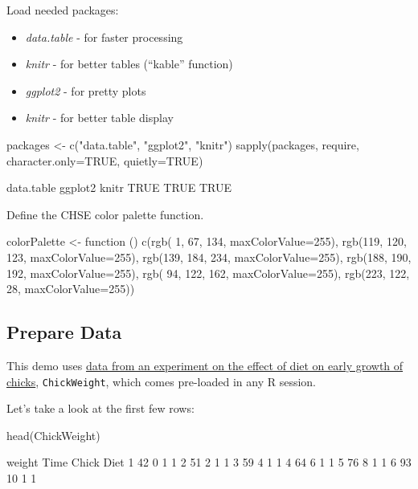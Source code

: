 \documentclass[10pt]{article}
\newenvironment{CodeChunk}{}{}
\begin{document}
Load needed packages:

\begin{itemize}
\itemsep1pt\parskip0pt
\item
  \emph{data.table} - for faster processing\\
\item
  \emph{knitr} - for better tables (``kable'' function)
\item
  \emph{ggplot2} - for pretty plots\\
\item
  \emph{knitr} - for better table display
\end{itemize}

\begin{CodeChunk}
\begin{CodeInput}
packages <- c("data.table", "ggplot2", "knitr")
sapply(packages, require, character.only=TRUE, quietly=TRUE)
\end{CodeInput}
\begin{CodeOutput}
data.table    ggplot2      knitr 
      TRUE       TRUE       TRUE 
\end{CodeOutput}
\end{CodeChunk}

Define the CHSE color palette function.

\begin{CodeChunk}
\begin{CodeInput}
colorPalette <- function () {
  c(rgb(  1,  67, 134, maxColorValue=255),
    rgb(119, 120, 123, maxColorValue=255),
    rgb(139, 184, 234, maxColorValue=255),
    rgb(188, 190, 192, maxColorValue=255),
    rgb( 94, 122, 162, maxColorValue=255),
    rgb(223, 122,  28, maxColorValue=255))
}
\end{CodeInput}
\end{CodeChunk}

\subsection*{Prepare Data}\label{prepare-data}

This demo uses
\href{http://www.inside-r.org/r-doc/datasets/ChickWeight}{data from an
experiment on the effect of diet on early growth of chicks},
\texttt{ChickWeight}, which comes pre-loaded in any R session.

Let's take a look at the first few rows:

\begin{CodeChunk}
\begin{CodeInput}
head(ChickWeight)
\end{CodeInput}
\begin{CodeOutput}
  weight Time Chick Diet
1     42    0     1    1
2     51    2     1    1
3     59    4     1    1
4     64    6     1    1
5     76    8     1    1
6     93   10     1    1
\end{CodeOutput}
\end{CodeChunk}
\end{document}
